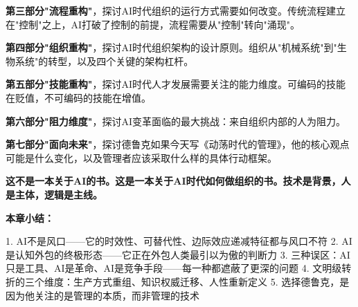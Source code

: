 \textbf{第三部分"流程重构"}，探讨AI时代组织的运行方式需要如何改变。传统流程建立在"控制"之上，AI打破了控制的前提，流程需要从"控制"转向"涌现"。

\textbf{第四部分"组织重构"}，探讨AI时代组织架构的设计原则。组织从"机械系统"到"生物系统"的转型，以及四个关键的架构杠杆。

\textbf{第五部分"技能重构"}，探讨AI时代人才发展需要关注的能力维度。可编码的技能在贬值，不可编码的技能在增值。

\textbf{第六部分"阻力维度"}，探讨AI变革面临的最大挑战：来自组织内部的人为阻力。

\textbf{第七部分"面向未来"}，探讨德鲁克如果今天写《动荡时代的管理》，他的核心观点可能是什么变化，以及管理者应该采取什么样的具体行动框架。

\textbf{这不是一本关于AI的书。这是一本关于AI时代如何做组织的书。技术是背景，人是主体，逻辑是主线。}


\textbf{本章小结：}

1. AI不是风口——它的时效性、可替代性、边际效应递减特征都与风口不符
2. AI是认知外包的终极形态——它正在外包人类最引以为傲的判断力
3. 三种误区：AI只是工具、AI是革命、AI是竞争手段——每一种都遮蔽了更深的问题
4. 文明级转折的三个维度：生产方式重组、知识权威迁移、人性重新定义
5. 选择德鲁克，是因为他关注的是管理的本质，而非管理的技术
